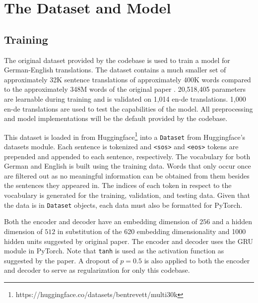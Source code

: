 \documentclass[11pt,a4paper]{article}
\begin{document}



\section{The Dataset and Model}
\subsection{Training}
The original dataset \cite{elliott-EtAl:2016:VL16} provided by the codebase is used to train a model for German-English translations. The dataset contains a much smaller set of approximately 32K sentence translations of approximately 400K words compared to the approximately 348M words of the original paper \cite{bahdanau2016neural}. 20,518,405 parameters are learnable during training and is validated on 1,014 en-de translations. 1,000 en-de translations are used to test the capabilities of the model. All preprocessing and model implementations will be the default provided by the codebase.

This dataset is loaded in from Huggingface\footnote{https://huggingface.co/datasets/bentrevett/multi30k} into a \verb|Dataset| from Huggingface's datasets module. Each sentence is tokenized and \verb|<sos>| and \verb|<eos>| tokens are prepended and appended to each sentence, respectively. The vocabulary for both German and English is built using the training data. Words that only occur once are filtered out as no meaningful information can be obtained from them besides the sentences they appeared in. The indices of each token in respect to the vocabulary is generated for the training, validation, and testing data. Given that the data is in \verb|Dataset| objects, each data must also be formatted for PyTorch. 

Both the encoder and decoder have an embedding dimension of $256$ and a hidden dimension of $512$ in substitution of the 620 embedding dimensionality and 1000 hidden units suggested by original paper. The encoder and decoder uses the GRU module in PyTorch. Note that \verb|tanh| is used as the activation function as suggested by the paper. A dropout of $p=0.5$ is also applied to both the encoder and decoder to serve as regularization for only this codebase. 
\end{document}
